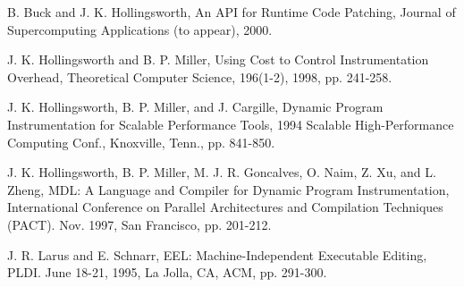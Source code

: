 B. Buck and J. K. Hollingsworth, {\textquotedbl}An API for Runtime Code Patching,{\textquotedbl} Journal of
Supercomputing Applications (to appear), 2000.

J. K. Hollingsworth and B. P. Miller, {\textquotedbl}Using Cost to Control Instrumentation
Overhead,{\textquotedbl} Theoretical Computer Science, 196(1-2), 1998, pp. 241-258.

J. K. Hollingsworth, B. P. Miller, and J. Cargille, {\textquotedbl}Dynamic Program Instrumentation for Scalable
Performance Tools,{\textquotedbl} 1994 Scalable High-Performance Computing Conf., Knoxville, Tenn., pp. 841-850.

J. K. Hollingsworth, B. P. Miller, M. J. R. Goncalves, O. Naim, Z. Xu, and L. Zheng, {\textquotedbl}MDL: A
Language and Compiler for Dynamic Program Instrumentation,{\textquotedbl} International Conference on Parallel
Architectures and Compilation Techniques (PACT). Nov. 1997, San Francisco, pp. 201-212.

J. R. Larus and E. Schnarr, {\textquotedbl}EEL: Machine-Independent Executable Editing,{\textquotedbl} PLDI. June
18-21, 1995, La Jolla, CA, ACM, pp. 291-300.

